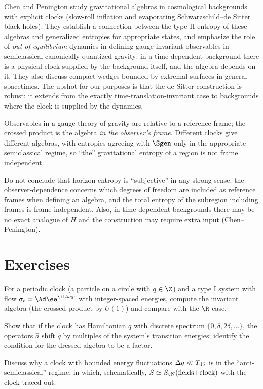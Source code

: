 Chen and Penington \cite{ChenPenington2024} study gravitational algebras in cosmological backgrounds with explicit clocks (slow-roll inflation and evaporating Schwarzschild--de Sitter black holes). They establish a connection between the type II entropy of these algebras and generalized entropies for appropriate states, and emphasize the role of \emph{out-of-equilibrium} dynamics in defining gauge-invariant observables in semiclassical canonically quantized gravity: in a time-dependent background there is a physical clock supplied by the background itself, and the algebra depends on it. They also discuss compact wedges bounded by extremal surfaces in general spacetimes. The upshot for our purposes is that the de Sitter construction is robust: it extends from the exactly time-translation-invariant case to backgrounds where the clock is supplied by the dynamics.

\begin{keyidea}
Observables in a gauge theory of gravity are relative to a reference frame; the crossed product is the algebra \emph{in the observer's frame}. Different clocks give different algebras, with entropies agreeing with $\Sgen$ only in the appropriate semiclassical regime, so ``the'' gravitational entropy of a region is not frame independent.
\end{keyidea}

\begin{whatwrong}
Do not conclude that horizon entropy is ``subjective'' in any strong sense: the observer-dependence concerns which degrees of freedom are included as reference frames when defining an algebra, and the total entropy of the subregion including frames is frame-independent. Also, in time-dependent backgrounds there may be no exact analogue of $H$ and the construction may require extra input (Chen--Penington).
\end{whatwrong}

\section*{Exercises}
\begin{exercise}
For a periodic clock (a particle on a circle with $q\in\Z$) and a type I system with flow $\sigma_t=\Ad\ee^{\ii t\omega_0\cdot}$ with integer-spaced energies, compute the invariant algebra (the crossed product by $U(1)$) and compare with the $\R$ case.
\end{exercise}
\begin{exercise}
Show that if the clock has Hamiltonian $q$ with discrete spectrum $\{0,\delta,2\delta,\dots\}$, the operators $\hat a$ shift $q$ by multiples of the system's transition energies; identify the condition for the dressed algebra to be a factor.
\end{exercise}
\begin{exercise}
Discuss why a clock with bounded energy fluctuations $\Delta q\ll T_{\rm dS}$ is in the ``anti-semiclassical'' regime, in which, schematically, $S\simeq S_{\rm vN}(\text{fields+clock})$ with the clock traced out.
\end{exercise}
